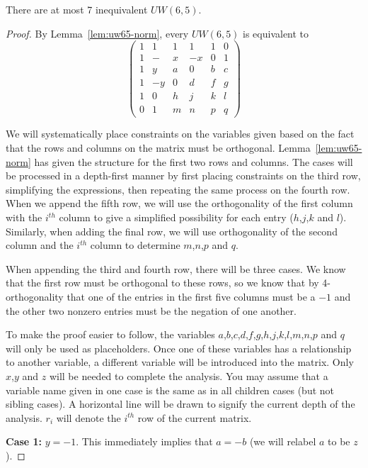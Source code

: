 \begin{lemma}\label{lem:uw65-cases}
 There are at most 7 inequivalent $UW(6,5)$.

 \begin{proof}
  By Lemma~\ref{lem:uw65-norm}, every $UW(6,5)$ is equivalent to
$$\left(\begin{array}{rrrrrr}
 1 &  1 & 1 & 1 & 1 & 0 \\
 1 &  - & x & -x & 0 & 1 \\
 1 &  y & a & 0 & b & c \\
 1 &  -y & 0 & d & f & g \\
 1 &  0 & h & j & k & l \\
 0 &  1 & m & n & p & q
\end{array}\right)$$

We will systematically place constraints on the variables given based on the fact that the rows and columns on the matrix must be orthogonal. Lemma~\ref{lem:uw65-norm} has given the structure for the first two rows and columns. The cases will be processed in a depth-first manner by first placing constraints on the third row, simplifying the expressions, then repeating the same process on the fourth row. When we append the fifth row, we will use the orthogonality of the first column with the $i^{th}$ column to give a simplified possibility for each entry ($h$,$j$,$k$ and $l$). Similarly, when adding the final row, we will use orthogonality of the second column and the $i^{th}$ column to determine $m$,$n$,$p$ and $q$.

When appending the third and fourth row, there will be three cases. We know that the first row must be orthogonal to these rows, so we know that by 4-orthogonality that one of the entries in the first five columns must be a $-1$ and the other two nonzero entries must be the negation of one another.

To make the proof easier to follow, the variables $a$,$b$,$c$,$d$,$f$,$g$,$h$,$j$,$k$,$l$,$m$,$n$,$p$ and $q$ will only be used as placeholders. Once one of these variables has a relationship to another variable, a different variable will be introduced into the matrix. Only $x$,$y$ and $z$ will be needed to complete the analysis. You may assume that a variable name given in one case is the same as in all children cases (but not sibling cases). A horizontal line will be drawn to signify the current depth 
of the analysis. $r_i$ will denote the $i^{th}$ row of the current matrix.

{\bf Case 1:} $y = -1$. This immediately implies that $a = -b$ (we will relabel $a$ to be $z$).


\end{proof}
\end{lemma}
